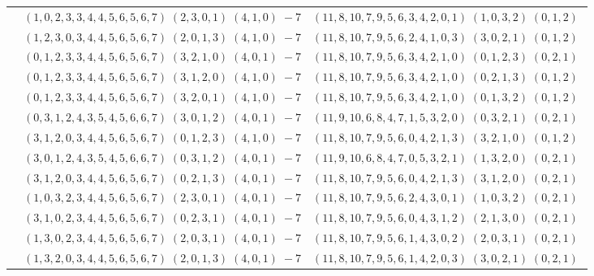 \documentclass[11pt]{article}
\begin{document}
\begin{longtable}[l]{|c|c|c|}
 \cline{2-3} 
 & $(1 ,0 ,2 ,3 ,3 ,4 ,4 ,5 ,6 ,5 ,6 ,7) \;(2 ,3 ,0 ,1) \;(4 ,1 ,0) \;-7$ & $(11 ,8 ,10 ,7 ,9 ,5 ,6 ,3 ,4 ,2 ,0 ,1) \;(1 ,0 ,3 ,2) \;(0 ,1 ,2) \;$\\ 
 \cline{2-3} 
 & $(1 ,2 ,3 ,0 ,3 ,4 ,4 ,5 ,6 ,5 ,6 ,7) \;(2 ,0 ,1 ,3) \;(4 ,1 ,0) \;-7$ & $(11 ,8 ,10 ,7 ,9 ,5 ,6 ,2 ,4 ,1 ,0 ,3) \;(3 ,0 ,2 ,1) \;(0 ,1 ,2) \;$\\ 
 \cline{2-3} 
 & $(0 ,1 ,2 ,3 ,3 ,4 ,4 ,5 ,6 ,5 ,6 ,7) \;(3 ,2 ,1 ,0) \;(4 ,0 ,1) \;-7$ & $(11 ,8 ,10 ,7 ,9 ,5 ,6 ,3 ,4 ,2 ,1 ,0) \;(0 ,1 ,2 ,3) \;(0 ,2 ,1) \;$\\ 
 \cline{2-3} 
 & $(0 ,1 ,2 ,3 ,3 ,4 ,4 ,5 ,6 ,5 ,6 ,7) \;(3 ,1 ,2 ,0) \;(4 ,1 ,0) \;-7$ & $(11 ,8 ,10 ,7 ,9 ,5 ,6 ,3 ,4 ,2 ,1 ,0) \;(0 ,2 ,1 ,3) \;(0 ,1 ,2) \;$\\ 
 \cline{2-3} 
 & $(0 ,1 ,2 ,3 ,3 ,4 ,4 ,5 ,6 ,5 ,6 ,7) \;(3 ,2 ,0 ,1) \;(4 ,1 ,0) \;-7$ & $(11 ,8 ,10 ,7 ,9 ,5 ,6 ,3 ,4 ,2 ,1 ,0) \;(0 ,1 ,3 ,2) \;(0 ,1 ,2) \;$\\ 
 \cline{2-3} 
 & $(0 ,3 ,1 ,2 ,4 ,3 ,5 ,4 ,5 ,6 ,6 ,7) \;(3 ,0 ,1 ,2) \;(4 ,0 ,1) \;-7$ & $(11 ,9 ,10 ,6 ,8 ,4 ,7 ,1 ,5 ,3 ,2 ,0) \;(0 ,3 ,2 ,1) \;(0 ,2 ,1) \;$\\ 
 \cline{2-3} 
 & $(3 ,1 ,2 ,0 ,3 ,4 ,4 ,5 ,6 ,5 ,6 ,7) \;(0 ,1 ,2 ,3) \;(4 ,1 ,0) \;-7$ & $(11 ,8 ,10 ,7 ,9 ,5 ,6 ,0 ,4 ,2 ,1 ,3) \;(3 ,2 ,1 ,0) \;(0 ,1 ,2) \;$\\ 
 \cline{2-3} 
 & $(3 ,0 ,1 ,2 ,4 ,3 ,5 ,4 ,5 ,6 ,6 ,7) \;(0 ,3 ,1 ,2) \;(4 ,0 ,1) \;-7$ & $(11 ,9 ,10 ,6 ,8 ,4 ,7 ,0 ,5 ,3 ,2 ,1) \;(1 ,3 ,2 ,0) \;(0 ,2 ,1) \;$\\ 
 \cline{2-3} 
 & $(3 ,1 ,2 ,0 ,3 ,4 ,4 ,5 ,6 ,5 ,6 ,7) \;(0 ,2 ,1 ,3) \;(4 ,0 ,1) \;-7$ & $(11 ,8 ,10 ,7 ,9 ,5 ,6 ,0 ,4 ,2 ,1 ,3) \;(3 ,1 ,2 ,0) \;(0 ,2 ,1) \;$\\ 
 \cline{2-3} 
 & $(1 ,0 ,3 ,2 ,3 ,4 ,4 ,5 ,6 ,5 ,6 ,7) \;(2 ,3 ,0 ,1) \;(4 ,0 ,1) \;-7$ & $(11 ,8 ,10 ,7 ,9 ,5 ,6 ,2 ,4 ,3 ,0 ,1) \;(1 ,0 ,3 ,2) \;(0 ,2 ,1) \;$\\ 
 \cline{2-3} 
 & $(3 ,1 ,0 ,2 ,3 ,4 ,4 ,5 ,6 ,5 ,6 ,7) \;(0 ,2 ,3 ,1) \;(4 ,0 ,1) \;-7$ & $(11 ,8 ,10 ,7 ,9 ,5 ,6 ,0 ,4 ,3 ,1 ,2) \;(2 ,1 ,3 ,0) \;(0 ,2 ,1) \;$\\ 
 \cline{2-3} 
 & $(1 ,3 ,0 ,2 ,3 ,4 ,4 ,5 ,6 ,5 ,6 ,7) \;(2 ,0 ,3 ,1) \;(4 ,0 ,1) \;-7$ & $(11 ,8 ,10 ,7 ,9 ,5 ,6 ,1 ,4 ,3 ,0 ,2) \;(2 ,0 ,3 ,1) \;(0 ,2 ,1) \;$\\ 
 \cline{2-3} 
 & $(1 ,3 ,2 ,0 ,3 ,4 ,4 ,5 ,6 ,5 ,6 ,7) \;(2 ,0 ,1 ,3) \;(4 ,0 ,1) \;-7$ & $(11 ,8 ,10 ,7 ,9 ,5 ,6 ,1 ,4 ,2 ,0 ,3) \;(3 ,0 ,2 ,1) \;(0 ,2 ,1) \;$\\ 

\end{longtable}
\end{document}
